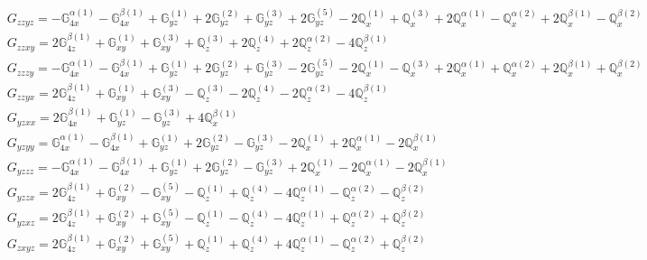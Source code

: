 \documentclass[fleqn,8pt,landscape]{jsarticle}
\begin{document}
\begin{align*}
& G_{zzyz} = - \mathbb{G}_{4x}^{\alpha(1)} - \mathbb{G}_{4x}^{\beta(1)} + \mathbb{G}_{yz}^{(1)} + 2 \mathbb{G}_{yz}^{(2)} + \mathbb{G}_{yz}^{(3)} + 2 \mathbb{G}_{yz}^{(5)} - 2 \mathbb{Q}_{x}^{(1)} + \mathbb{Q}_{x}^{(3)} + 2 \mathbb{Q}_{x}^{\alpha(1)} - \mathbb{Q}_{x}^{\alpha(2)} + 2 \mathbb{Q}_{x}^{\beta(1)} - \mathbb{Q}_{x}^{\beta(2)} \\
& G_{zzxy} = 2 \mathbb{G}_{4z}^{\beta(1)} + \mathbb{G}_{xy}^{(1)} + \mathbb{G}_{xy}^{(3)} + \mathbb{Q}_{z}^{(3)} + 2 \mathbb{Q}_{z}^{(4)} + 2 \mathbb{Q}_{z}^{\alpha(2)} - 4 \mathbb{Q}_{z}^{\beta(1)} \\
& G_{zzzy} = - \mathbb{G}_{4x}^{\alpha(1)} - \mathbb{G}_{4x}^{\beta(1)} + \mathbb{G}_{yz}^{(1)} + 2 \mathbb{G}_{yz}^{(2)} + \mathbb{G}_{yz}^{(3)} - 2 \mathbb{G}_{yz}^{(5)} - 2 \mathbb{Q}_{x}^{(1)} - \mathbb{Q}_{x}^{(3)} + 2 \mathbb{Q}_{x}^{\alpha(1)} + \mathbb{Q}_{x}^{\alpha(2)} + 2 \mathbb{Q}_{x}^{\beta(1)} + \mathbb{Q}_{x}^{\beta(2)} \\
& G_{zzyx} = 2 \mathbb{G}_{4z}^{\beta(1)} + \mathbb{G}_{xy}^{(1)} + \mathbb{G}_{xy}^{(3)} - \mathbb{Q}_{z}^{(3)} - 2 \mathbb{Q}_{z}^{(4)} - 2 \mathbb{Q}_{z}^{\alpha(2)} - 4 \mathbb{Q}_{z}^{\beta(1)} \\
& G_{yzxx} = 2 \mathbb{G}_{4x}^{\beta(1)} + \mathbb{G}_{yz}^{(1)} - \mathbb{G}_{yz}^{(3)} + 4 \mathbb{Q}_{x}^{\beta(1)} \\
& G_{yzyy} = \mathbb{G}_{4x}^{\alpha(1)} - \mathbb{G}_{4x}^{\beta(1)} + \mathbb{G}_{yz}^{(1)} + 2 \mathbb{G}_{yz}^{(2)} - \mathbb{G}_{yz}^{(3)} - 2 \mathbb{Q}_{x}^{(1)} + 2 \mathbb{Q}_{x}^{\alpha(1)} - 2 \mathbb{Q}_{x}^{\beta(1)} \\
& G_{yzzz} = - \mathbb{G}_{4x}^{\alpha(1)} - \mathbb{G}_{4x}^{\beta(1)} + \mathbb{G}_{yz}^{(1)} + 2 \mathbb{G}_{yz}^{(2)} - \mathbb{G}_{yz}^{(3)} + 2 \mathbb{Q}_{x}^{(1)} - 2 \mathbb{Q}_{x}^{\alpha(1)} - 2 \mathbb{Q}_{x}^{\beta(1)} \\
& G_{yzzx} = 2 \mathbb{G}_{4z}^{\beta(1)} + \mathbb{G}_{xy}^{(2)} - \mathbb{G}_{xy}^{(5)} - \mathbb{Q}_{z}^{(1)} + \mathbb{Q}_{z}^{(4)} - 4 \mathbb{Q}_{z}^{\alpha(1)} - \mathbb{Q}_{z}^{\alpha(2)} - \mathbb{Q}_{z}^{\beta(2)} \\
& G_{yzxz} = 2 \mathbb{G}_{4z}^{\beta(1)} + \mathbb{G}_{xy}^{(2)} + \mathbb{G}_{xy}^{(5)} - \mathbb{Q}_{z}^{(1)} - \mathbb{Q}_{z}^{(4)} - 4 \mathbb{Q}_{z}^{\alpha(1)} + \mathbb{Q}_{z}^{\alpha(2)} + \mathbb{Q}_{z}^{\beta(2)} \\
& G_{zxyz} = 2 \mathbb{G}_{4z}^{\beta(1)} + \mathbb{G}_{xy}^{(2)} + \mathbb{G}_{xy}^{(5)} + \mathbb{Q}_{z}^{(1)} + \mathbb{Q}_{z}^{(4)} + 4 \mathbb{Q}_{z}^{\alpha(1)} - \mathbb{Q}_{z}^{\alpha(2)} + \mathbb{Q}_{z}^{\beta(2)} \\

\end{align*}
\end{document}
